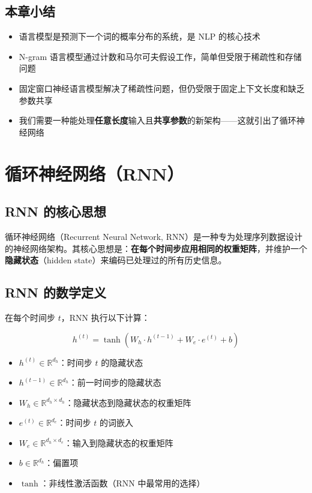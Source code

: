 \documentclass[a4paper]{article}
\begin{document}
\subsection{本章小结}

\begin{itemize}
    \item 语言模型是预测下一个词的概率分布的系统，是 NLP 的核心技术
    \item N-gram 语言模型通过计数和马尔可夫假设工作，简单但受限于稀疏性和存储问题
    \item 固定窗口神经语言模型解决了稀疏性问题，但仍受限于固定上下文长度和缺乏参数共享
    \item 我们需要一种能处理\textbf{任意长度}输入且\textbf{共享参数}的新架构——这就引出了循环神经网络
\end{itemize}


\section{循环神经网络（RNN）}

\subsection{RNN 的核心思想}

循环神经网络（Recurrent Neural Network, RNN）是一种专为处理序列数据设计的神经网络架构。其核心思想是：\textbf{在每个时间步应用相同的权重矩阵}，并维护一个\textbf{隐藏状态}（hidden state）来编码已处理过的所有历史信息。





\subsection{RNN 的数学定义}

在每个时间步 $t$，RNN 执行以下计算：

$$h^{(t)} = \tanh(W_h \cdot h^{(t-1)} + W_e \cdot e^{(t)} + b)$$

\begin{itemize}
    \item $h^{(t)} \in \mathbb{R}^{d_h}$：时间步 $t$ 的隐藏状态
    \item $h^{(t-1)} \in \mathbb{R}^{d_h}$：前一时间步的隐藏状态
    \item $W_h \in \mathbb{R}^{d_h \times d_h}$：隐藏状态到隐藏状态的权重矩阵
    \item $e^{(t)} \in \mathbb{R}^{d_e}$：时间步 $t$ 的词嵌入
    \item $W_e \in \mathbb{R}^{d_h \times d_e}$：输入到隐藏状态的权重矩阵
    \item $b \in \mathbb{R}^{d_h}$：偏置项
    \item $\tanh$：非线性激活函数（RNN 中最常用的选择）
\end{itemize}
\end{document}
